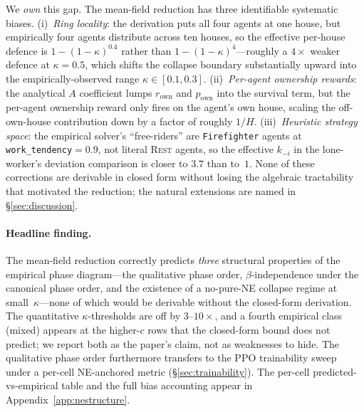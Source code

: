 \documentclass{anvil-paper}
\begin{document}
We \emph{own} this gap. The mean-field reduction has three identifiable
systematic biases. (i)~\emph{Ring locality}: the derivation puts all four
agents at one house, but empirically four agents distribute across ten
houses, so the effective per-house defence is $1{-}(1{-}\kappa)^{0.4}$ rather
than $1{-}(1{-}\kappa)^4$---roughly a $4\times$ weaker defence at $\kappa{=}0.5$,
which shifts the collapse boundary substantially upward into the
empirically-observed range $\kappa\in[0.1,0.3]$. (ii)~\emph{Per-agent
ownership rewards}: the analytical $A$ coefficient lumps $r_{\text{own}}$
and $p_{\text{own}}$ into the survival term, but the per-agent ownership
reward only fires on the agent's own house, scaling the off-own-house
contribution down by a factor of roughly $1/H$. (iii)~\emph{Heuristic
strategy space}: the empirical solver's ``free-riders'' are
\texttt{Firefighter} agents at \texttt{work\_tendency}${=}0.9$, not literal
\textsc{Rest} agents, so the effective $k_{-i}$ in the lone-worker's
deviation comparison is closer to $3.7$ than to~$1$. None of these
corrections are derivable in closed form without losing the algebraic
tractability that motivated the reduction; the natural extensions are
named in \S\ref{sec:discussion}.

\paragraph{Headline finding.}
The mean-field reduction correctly predicts \emph{three} structural
properties of the empirical phase diagram---the qualitative phase order,
$\beta$-independence under the canonical phase order, and the existence of a
no-pure-NE collapse regime at small~$\kappa$---none of which would be
derivable without the closed-form derivation. The quantitative
$\kappa$-thresholds are off by $3$--$10\times$, and a fourth empirical class
(\textsf{mixed}) appears at the higher-$c$ rows that the closed-form bound
does not predict; we report both as the paper's claim, not as weaknesses to
hide. The qualitative phase order furthermore transfers to the PPO
trainability sweep under a per-cell NE-anchored metric
(\S\ref{sec:trainability}). The per-cell predicted-vs-empirical table and
the full bias accounting appear in Appendix~\ref{app:nestructure}.
\end{document}
